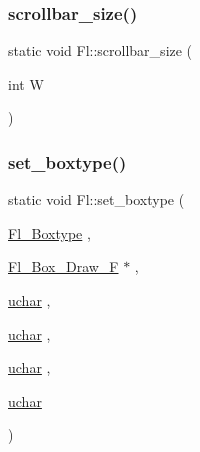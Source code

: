 \mbox{\label{class_fl_aca2f98b26f2552b82dd245b8094a41aa}} 
\subsubsection{\texorpdfstring{scrollbar\+\_\+size()}{scrollbar\_size()}\hspace{0.1cm}{\footnotesize\ttfamily [2/2]}}
{\footnotesize\ttfamily static void Fl\+::scrollbar\+\_\+size (\begin{DoxyParamCaption}\item[{int}]{W }\end{DoxyParamCaption})\hspace{0.3cm}{\ttfamily [static]}}

\mbox{\label{class_fl_a69bb6c6055494e38ca102105ed525525}} 
\subsubsection{\texorpdfstring{set\+\_\+boxtype()}{set\_boxtype()}\hspace{0.1cm}{\footnotesize\ttfamily [1/2]}}
{\footnotesize\ttfamily static void Fl\+::set\+\_\+boxtype (\begin{DoxyParamCaption}\item[{\hyperlink{_enumerations_8_h_ae48bf9070f8541de17829f54ccacc6bc}{Fl\+\_\+\+Boxtype}}]{,  }\item[{\hyperlink{group__callback__functions_gacb24a62f521a0e02cd7872a3bfbf3855}{Fl\+\_\+\+Box\+\_\+\+Draw\+\_\+F} $\ast$}]{,  }\item[{\hyperlink{fl__types_8h_a65f85814a8290f9797005d3b28e7e5fc}{uchar}}]{,  }\item[{\hyperlink{fl__types_8h_a65f85814a8290f9797005d3b28e7e5fc}{uchar}}]{,  }\item[{\hyperlink{fl__types_8h_a65f85814a8290f9797005d3b28e7e5fc}{uchar}}]{,  }\item[{\hyperlink{fl__types_8h_a65f85814a8290f9797005d3b28e7e5fc}{uchar}}]{ }\end{DoxyParamCaption})\hspace{0.3cm}{\ttfamily [static]}}

\mbox{\label{class_fl_ac570da0a6d55ad1205b4ddd56ed14fe3}} 
